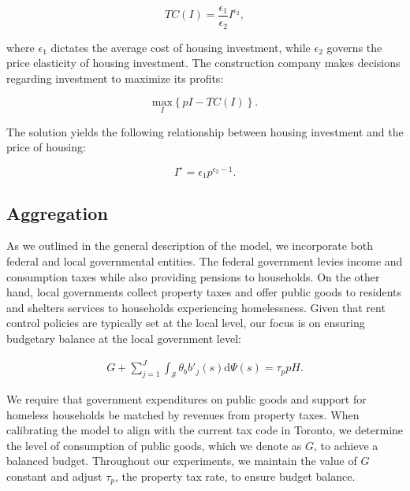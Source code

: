 \documentclass[parskip=full]{article}
\begin{document}
\begin{equation*}
TC(I)=\frac{\epsilon_{1}}{\epsilon_{2}}I^{\epsilon_{2}}\label{eq:total_cost_structure},
\end{equation*}

\noindent where $\epsilon_{1}$ dictates the average cost of housing investment, while $\epsilon_{2}$ governs the price elasticity of housing investment. The construction company makes decisions regarding investment to maximize its profits:

\begin{equation*}
\label{eq:construction_company_profits}
\underset{I} {\text{$\mbox{max}$}}{\left\{p I-TC(I)\right\}}.
\end{equation*}

\noindent The solution yields the following relationship between housing investment and the price of housing:

\begin{equation}
\label{eq:construction_company_first_order_condition}
I^{\star}=\epsilon_{1} p^{\epsilon_{2}-1}.
\end{equation}

\subsection{Aggregation}\label{subsection:aggregation}

As we outlined in the general description of the model, we incorporate both federal and local governmental entities. The federal government levies income and consumption taxes while also providing pensions to households. On the other hand, local governments collect property taxes and offer public goods to residents and shelters services to households experiencing homelessness. Given that rent control policies are typically set at the local level, our focus is on ensuring budgetary balance at the local government level:

\begin{align}\label{eq:gbc}
  G + \sum_{j=1}^J \int_\mathcal{S} \theta_{b} b'_{j}(s)\mathrm{d}\Psi(s)  = \tau_{p} p H.
\end{align}

\noindent We require that government expenditures on public goods and support for homeless households be matched by revenues from property taxes. When calibrating the model to align with the current tax code in Toronto, we determine the level of consumption of public goods, which we denote as $G$, to achieve a balanced budget. Throughout our experiments, we maintain the value of $G$ constant and adjust $\tau_{p}$, the property tax rate, to ensure budget balance.
\end{document}
